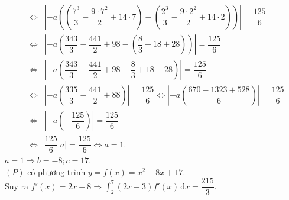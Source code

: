 \begin{ex}
{\begin{eqnarray*}
		&\Leftrightarrow & \left| -a \left( \left( \dfrac{7^3}{3} - \dfrac{9 \cdot 7^2}{2} + 14 \cdot 7 \right) -  \left( \dfrac{2^3}{3} - \dfrac{9 \cdot 2^2}{2} + 14 \cdot 2 \right) \right) \right| = \dfrac{125}{6}\\
		&\Leftrightarrow  & \left| -a \left( \dfrac{343}{3} - \dfrac{441}{2} + 98 - \left( \dfrac{8}{3} - 18 + 28 \right) \right) \right| = \dfrac{125}{6}\\
		&\Leftrightarrow & \left| -a \left( \dfrac{343}{3} - \dfrac{441}{2} + 98 - \dfrac{8}{3} + 18 - 28 \right) \right|  = \dfrac{125}{6}\\
		&\Leftrightarrow & \left| -a \left( \dfrac{335}{3} -  \dfrac{441}{2} + 88 \right) \right| = \dfrac{125}{6}
		 \Leftrightarrow \left| -a \left( \dfrac{670 - 1323 + 528}{6} \right) \right| = \dfrac{125}{6}\\
		&\Leftrightarrow & \left| -a \left(  -\dfrac{125}{6} \right) \right| = \dfrac{125}{6}\\
		&\Leftrightarrow & \dfrac{125}{6} |a| =  \dfrac{125}{6} \Leftrightarrow a = 1.
	\end{eqnarray*}
	$a = 1 \Rightarrow b = -8; c = 17$.\\ 
	$(P)$ có phương trình $y = f(x) = x^2 - 8x  + 17$.\\
	Suy ra $f'(x) = 2x  - 8 \Rightarrow \displaystyle\int_{2}^{7} (2x - 3)f'(x) \mathrm{\,d}x = \dfrac{215}{3}$.
} 
\end{ex}



